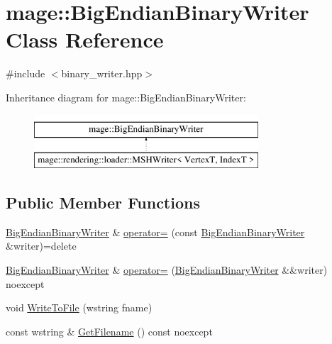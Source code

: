 \hypertarget{classmage_1_1_big_endian_binary_writer}{}\section{mage\+:\+:Big\+Endian\+Binary\+Writer Class Reference}
\label{classmage_1_1_big_endian_binary_writer}


{\ttfamily \#include $<$binary\+\_\+writer.\+hpp$>$}

Inheritance diagram for mage\+:\+:Big\+Endian\+Binary\+Writer\+:\begin{figure}[H]
\begin{center}
\leavevmode
\includegraphics[height=2.000000cm]{classmage_1_1_big_endian_binary_writer}
\end{center}
\end{figure}
\subsection*{Public Member Functions}
\begin{DoxyCompactItemize}
\item 
\mbox{\hyperlink{classmage_1_1_big_endian_binary_writer}{Big\+Endian\+Binary\+Writer}} \& \mbox{\hyperlink{classmage_1_1_big_endian_binary_writer_ae574f7d0b630890256996c52818ba633}{operator=}} (const \mbox{\hyperlink{classmage_1_1_big_endian_binary_writer}{Big\+Endian\+Binary\+Writer}} \&writer)=delete
\item 
\mbox{\hyperlink{classmage_1_1_big_endian_binary_writer}{Big\+Endian\+Binary\+Writer}} \& \mbox{\hyperlink{classmage_1_1_big_endian_binary_writer_a8c01bf43f5e941578c5c5947ea184a78}{operator=}} (\mbox{\hyperlink{classmage_1_1_big_endian_binary_writer}{Big\+Endian\+Binary\+Writer}} \&\&writer) noexcept
\item 
void \mbox{\hyperlink{classmage_1_1_big_endian_binary_writer_a3a49f78f308a0827f4a99150ad49d7c1}{Write\+To\+File}} (wstring fname)
\item 
const wstring \& \mbox{\hyperlink{classmage_1_1_big_endian_binary_writer_a61a80be19c7b59ff5803e51401e8f646}{Get\+Filename}} () const noexcept
\end{DoxyCompactItemize}
